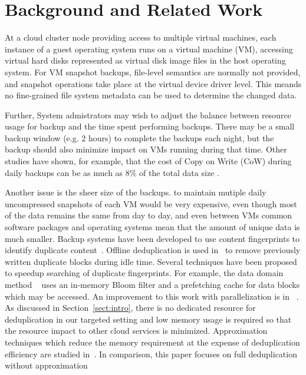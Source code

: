 
\section{Background and Related Work}
\label{sect:background}


At a cloud cluster node providing access to multiple virtual machines, each
instance of a guest operating system runs on a virtual machine (VM), accessing
virtual hard disks represented as virtual disk image files in the host
operating system. For VM snapshot backups, file-level semantics are normally
not provided, and snapshot operations take place at the virtual device driver
level.  This meands no fine-grained file system metadata can be used to
determine the changed data.

Further, System admistrators may wish to adjust the balance between resource 
usage for backup and the time spent performing backups. There may be a small
backup window (e.g. 2 hours) to complete the backups each night, but the backup
should also minimize impact on VMs running during that time. Other studies have
shown, for example, that the cost of Copy on Write (CoW) during daily backups
can be as much as 8\% of the total data size \cite{EMCIncrementalDataChanges}.

Another issue is the sheer size of the backups. to maintain mutiple daily
uncompressed snapshots of each VM would be very expensive, even though
most of the data remains the same from day to day, and even between VMs common
software packages and operating systems mean that the amount of unique data is
much smaller. Backup systems have been developed to use content fingerprints to
identify duplicate content~\cite{venti02,Rhea2008}. Offline deduplication is
used in~\cite{EMC,NetAppOffline} to remove previously written duplicate blocks
during idle time.  Several techniques have been proposed to speedup searching
of duplicate fingerprints. For example, the data domain method
~\cite{bottleneck08} uses  an in-memory Bloom filter and a prefetching cache
for data blocks  which may be accessed.  An improvement to this work with
parallelization is in ~\cite{MAD210,DEBAR}.  As discussed in
Section~\ref{sect:intro}, there is no dedicated resource for deduplication in
our targeted setting and low memory usage is required so that the resource
impact to other cloud services is minimized. Approximation techniques which
reduce the memory requirement at the expense of deduplication efficiency are
studied in~\cite{extreme_binning09,Guo2011,WeiZhangIEEE}.  In comparison, this
paper focuses on full deduplication without approximation

